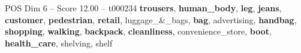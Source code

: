 \begin{textsample}{POS Dim 6 – Score 12.00 – t000234}  \label{ex:f6_pos_028}
\textbf{trousers}, \textbf{human\_body}, \textbf{leg}, \textbf{jeans}, \textbf{customer}, \textbf{pedestrian}, \textbf{retail}, luggage\_\&\_bags, \textbf{bag}, advertising, \textbf{handbag}, \textbf{shopping}, \textbf{walking}, \textbf{backpack}, \textbf{cleanliness}, convenience\_store, \textbf{boot}, \textbf{health\_care}, shelving, shelf

\end{textsample}
